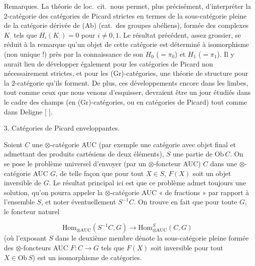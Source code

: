 \documentclass[11pt,a4paper]{article}
\begin{document}
Remarques. La théorie de loc.\ cit.\ nous permet, plus précisément,
d'interpréter la 2-catégorie des catégories de Picard strictes en termes
de la sous-catégorie pleine de la catégorie dérivée de (Ab) (cat.\ des
groupes abéliens), formée des complexes $K_{.}$ tels que $H_{i}(K_{.}) =
0$ pour $i \neq 0, 1$.  Le
résultat précédent, assez grossier, se réduit à la remarque qu'un objet de
cette catégorie est déterminé à isomorphisme (non unique !) près par la
connaissance de son $H_{0}$ ($= \pi_{0}$) et $H_{1}$ ($= \pi_{1}$). Il y
aurait lieu de développer également pour les catégories de Picard non
nécessairement strictes, et pour les (Gr)-catégories, une théorie de
structure pour la 2-catégorie qu'ils forment. De plus, ces développements
encore dans les limbes, tout comme ceux que \struck{\ill} nous venons
d'esquisser, devraient être un jour \struck{\ill} étudiés dans le cadre
des champs (en (Gr)-catégories, ou en catégories de Picard) tout comme
dans Deligne [ ].

3. Catégories de Picard enveloppantes.

Soient $C$ une \struck{\ill} $\otimes$-catégorie AUC (par exemple une
catégorie avec objet final et admettant des produits cartésiens de deux
éléments), $S$ une partie de $\mathrm{Ob}\,C$. On se pose le problème
universel d'envoyer (par un $\otimes$-foncteur AUC) $C$ dans une
$\otimes$-catégorie AUC $G$, de telle façon que pour tout $X \in S$,
$F(X)$ soit un objet inversible de $G$.  Le résultat principal ici est
que ce problème admet toujours une solution, qu'on pourra appeler la
$\otimes$-catégorie AUC « de fractions » par rapport à l'ensemble $S$, et
noter éventuellement $S^{-1}C$. On trouve en fait que pour toute $G$, le
foncteur naturel

\[
\mathrm{Hom}_{\otimes \mathrm{AUC}}(S^{-1}C, G) \longrightarrow
\mathrm{Hom}^{S}_{\otimes \mathrm{AUC}}(C, G)
\]
(où l'exposant $S$ dans le deuxième membre dénote la sous-catégorie pleine
formée des $\otimes$-foncteurs AUC $F : C \to G$ tels que $F(X)$ soit
inversible pour tout $X \in \mathrm{Ob}\,S$) est un isomorphisme de
catégories.
\end{document}

